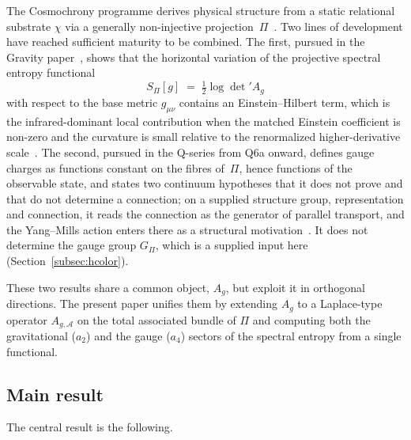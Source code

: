 \documentclass[12pt,a4paper]{article}
\theoremstyle{remark}
\theoremstyle{plain}
\theoremstyle{definition}
\begin{document}
    The Cosmochrony programme derives physical structure from a static
    relational substrate $\chi$ via a generally non-injective
    projection~$\Pi$~\cite{Beau2026m,Cosmochrony}.
    Two lines of development have reached sufficient maturity to be
    combined.
    The first, pursued in the Gravity paper~\cite{Beau2026h}, shows that the horizontal
    variation
    of the projective spectral entropy functional
    \begin{equation}\label{eq:spectral-entropy}
      S_\Pi[g]
      \;=\;
      \tfrac{1}{2}\log\det'\! A_g
    \end{equation}
    with respect to the base metric $g_{\mu\nu}$ contains an
    Einstein--Hilbert term, which is the infrared-dominant local
    contribution when the matched Einstein coefficient is non-zero and the curvature is small relative to the
    renormalized higher-derivative scale~\cite{Beau2026h}.
    The second, pursued in the Q-series from Q6a onward, defines gauge charges as functions
    constant on the fibres of~$\Pi$, hence functions of the observable state, and states two
    continuum hypotheses that it does not prove and that do not determine a connection; on a
    supplied structure group, representation and connection, it reads the connection as the
    generator of parallel transport, and the Yang--Mills action enters there as a structural
    motivation~\cite{Beau2026q6a}.
    It does not determine the gauge group $G_\Pi$, which is a supplied input here
    (Section~\ref{subsec:hcolor}).

    These two results share a common object, $A_g$, but exploit it
    in orthogonal directions.
    The present paper unifies them by extending $A_g$ to a
    Laplace-type operator $A_{g,\mathcal{A}}$ on the total associated
    bundle of $\Pi$ and computing both the gravitational ($a_2$) and
    the gauge ($a_4$) sectors of the spectral entropy from a single
    functional.

    \subsection{Main result}
      \label{subsec:main-result}

      The central result is the following.
\end{document}
